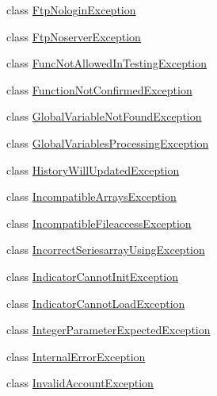 \begin{DoxyCompactItemize}
\item 
class \hyperlink{class_m_q_l4_c_sharp_1_1_base_1_1_exceptions_1_1_ftp_nologin_exception}{Ftp\+Nologin\+Exception}
\item 
class \hyperlink{class_m_q_l4_c_sharp_1_1_base_1_1_exceptions_1_1_ftp_noserver_exception}{Ftp\+Noserver\+Exception}
\item 
class \hyperlink{class_m_q_l4_c_sharp_1_1_base_1_1_exceptions_1_1_func_not_allowed_in_testing_exception}{Func\+Not\+Allowed\+In\+Testing\+Exception}
\item 
class \hyperlink{class_m_q_l4_c_sharp_1_1_base_1_1_exceptions_1_1_function_not_confirmed_exception}{Function\+Not\+Confirmed\+Exception}
\item 
class \hyperlink{class_m_q_l4_c_sharp_1_1_base_1_1_exceptions_1_1_global_variable_not_found_exception}{Global\+Variable\+Not\+Found\+Exception}
\item 
class \hyperlink{class_m_q_l4_c_sharp_1_1_base_1_1_exceptions_1_1_global_variables_processing_exception}{Global\+Variables\+Processing\+Exception}
\item 
class \hyperlink{class_m_q_l4_c_sharp_1_1_base_1_1_exceptions_1_1_history_will_updated_exception}{History\+Will\+Updated\+Exception}
\item 
class \hyperlink{class_m_q_l4_c_sharp_1_1_base_1_1_exceptions_1_1_incompatible_arrays_exception}{Incompatible\+Arrays\+Exception}
\item 
class \hyperlink{class_m_q_l4_c_sharp_1_1_base_1_1_exceptions_1_1_incompatible_fileaccess_exception}{Incompatible\+Fileaccess\+Exception}
\item 
class \hyperlink{class_m_q_l4_c_sharp_1_1_base_1_1_exceptions_1_1_incorrect_seriesarray_using_exception}{Incorrect\+Seriesarray\+Using\+Exception}
\item 
class \hyperlink{class_m_q_l4_c_sharp_1_1_base_1_1_exceptions_1_1_indicator_cannot_init_exception}{Indicator\+Cannot\+Init\+Exception}
\item 
class \hyperlink{class_m_q_l4_c_sharp_1_1_base_1_1_exceptions_1_1_indicator_cannot_load_exception}{Indicator\+Cannot\+Load\+Exception}
\item 
class \hyperlink{class_m_q_l4_c_sharp_1_1_base_1_1_exceptions_1_1_integer_parameter_expected_exception}{Integer\+Parameter\+Expected\+Exception}
\item 
class \hyperlink{class_m_q_l4_c_sharp_1_1_base_1_1_exceptions_1_1_internal_error_exception}{Internal\+Error\+Exception}
\item 
class \hyperlink{class_m_q_l4_c_sharp_1_1_base_1_1_exceptions_1_1_invalid_account_exception}{Invalid\+Account\+Exception}

\end{DoxyCompactItemize}
